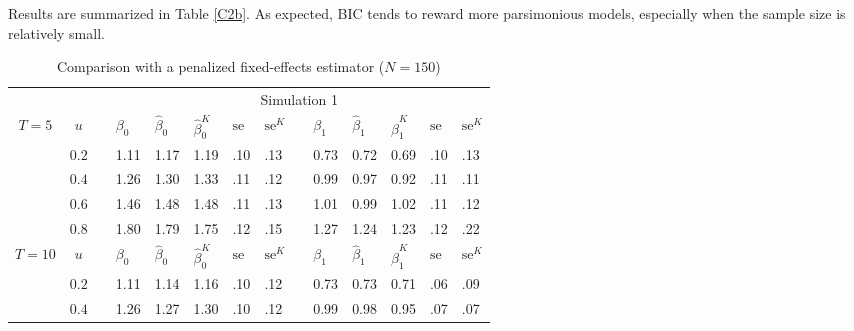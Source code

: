 \documentclass[12pt]{article}
\begin{document}
Results are summarized in Table \ref{C2b}. As expected, \textsc{BIC} tends to reward more parsimonious models,
especially when the sample size is relatively small. 



\begin{table}
\footnotesize
\renewcommand\thetable{C1a}
\caption{Comparison with a penalized fixed-effects estimator ($N = 150$)}
\label{C1a}
\centering
\begin{tabular}{cc
m{0.01cm}m{0.5cm}m{0.5cm}m{0.5cm}m{0.3cm}m{0.3cm}
m{0.01cm}m{0.5cm}m{0.5cm}m{0.5cm}m{0.3cm}m{0.3cm}
}
\noalign{\vspace{0.2cm}}
\hline
\hline
\noalign{\vspace{0.2cm}}
 &&& \multicolumn{11}{c}{Simulation 1}\\
\noalign{\vspace{0.1cm}}
\hline
\noalign{\vspace{0.2cm}}
$T = 5$ & $u$ && 
	$\beta_0$ & $\hat\beta_0$ & $\hat\beta_0^K$ & $\text{se}$ & $\text{se}^K$ &&
	$\beta_1$ & $\hat\beta_1$ & $\hat\beta_1^K$ & $\text{se}$ & $\text{se}^K$\\
\cline{4-8}\cline{10-14}
\noalign{\vspace{0.1cm}}
& $0.2$ && 1.11 & 1.17 & 1.19 & .10 & .13 && 0.73 & 0.72 & 0.69 & .10 & .13 \\
& $0.4$ && 1.26 & 1.30 & 1.33 & .11 & .12 && 0.99 & 0.97 & 0.92 & .11 & .11 \\
& $0.6$ && 1.46 & 1.48 & 1.48 & .11 & .13 && 1.01 & 0.99 & 1.02 & .11 & .12 \\
& $0.8$ && 1.80 & 1.79 & 1.75 & .12 & .15 && 1.27 & 1.24 & 1.23 & .12 & .22 \\
\noalign{\vspace{0.2cm}}
$T = 10$ & $u$ && 
	$\beta_0$ & $\hat\beta_0$ & $\hat\beta_0^K$ & $\text{se}$ & $\text{se}^K$ &&
	$\beta_1$ & $\hat\beta_1$ & $\hat\beta_1^K$ & $\text{se}$ & $\text{se}^K$\\
\cline{4-8}\cline{10-14}
\noalign{\vspace{0.1cm}}
& $0.2$ && 1.11 & 1.14 & 1.16 & .10 & .12 && 0.73 & 0.73 & 0.71 & .06 & .09 \\
& $0.4$ && 1.26 & 1.27 & 1.30 & .10 & .12 && 0.99 & 0.98 & 0.95 & .07 & .07 \\

\end{tabular}
\end{table}
\end{document}
